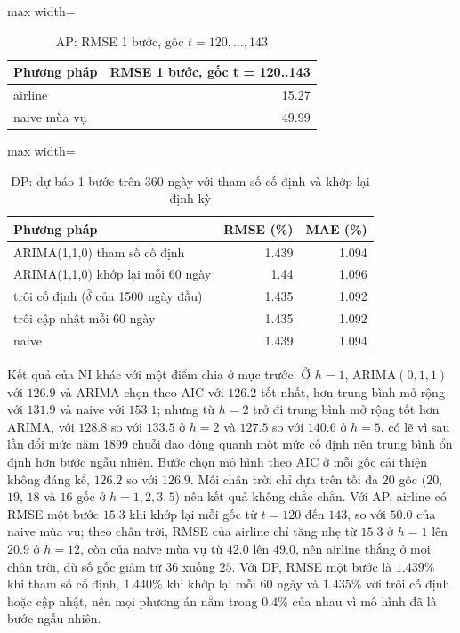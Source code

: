\begin{table}[H]
\centering\footnotesize
\caption{AP: RMSE 1 bước, gốc $t=120,\dots,143$}\label{tab:tab_b12_12_ap_one_step}
\begin{adjustbox}{max width=\linewidth}
\begin{tabular}{|l|r|}
\toprule
Phương pháp & RMSE 1 bước, gốc t = 120..143 \\
\midrule
airline & 15.27 \\
naive mùa vụ & 49.99 \\
\bottomrule
\end{tabular}
\end{adjustbox}
\end{table}
\begin{table}[H]
\centering\footnotesize
\caption{DP: dự báo 1 bước trên 360 ngày với tham số cố định và khớp lại định kỳ}\label{tab:tab_b12_12_dp_rolling}
\begin{adjustbox}{max width=\linewidth}
\begin{tabular}{|>{\raggedright\arraybackslash}p{}|r|r|}
\toprule
Phương pháp & RMSE (\%) & MAE (\%) \\
\midrule
ARIMA(1,1,0) tham số cố định & 1.439 & 1.094 \\[3pt]
ARIMA(1,1,0) khớp lại mỗi 60 ngày & 1.44 & 1.096 \\[3pt]
trôi cố định ($\hat{\delta}$ của 1500 ngày đầu) & 1.435 & 1.092 \\[3pt]
trôi cập nhật mỗi 60 ngày & 1.435 & 1.092 \\[3pt]
naive & 1.439 & 1.094 \\[3pt]
\bottomrule
\end{tabular}
\end{adjustbox}
\end{table}
 Kết quả của NI khác với một điểm chia ở mục trước. Ở $h=1$, ARIMA$(0,1,1)$ với $126.9$ và ARIMA chọn theo AIC với $126.2$ tốt nhất, hơn trung bình mở rộng với $131.9$ và naive với $153.1$; nhưng từ $h=2$ trở đi trung bình mở rộng tốt hơn ARIMA, với $128.8$ so với $133.5$ ở $h=2$ và $127.5$ so với $140.6$ ở $h=5$, có lẽ vì sau lần đổi mức năm 1899 chuỗi dao động quanh một mức cố định nên trung bình ổn định hơn bước ngẫu nhiên. Bước chọn mô hình theo AIC ở mỗi gốc cải thiện không đáng kể, $126.2$ so với $126.9$. Mỗi chân trời chỉ dựa trên tối đa $20$ gốc ($20$, $19$, $18$ và $16$ gốc ở $h=1,2,3,5$) nên kết quả không chắc chắn. Với AP, airline có RMSE một bước $15.3$ khi khớp lại mỗi gốc từ $t=120$ đến $143$, so với $50.0$ của naive mùa vụ; theo chân trời, RMSE của airline chỉ tăng nhẹ từ $15.3$ ở $h=1$ lên $20.9$ ở $h=12$, còn của naive mùa vụ từ $42.0$ lên $49.0$, nên airline thắng ở mọi chân trời, dù số gốc giảm từ $36$ xuống $25$. Với DP, RMSE một bước là $1.439\%$ khi tham số cố định, $1.440\%$ khi khớp lại mỗi $60$ ngày và $1.435\%$ với trôi cố định hoặc cập nhật, nên mọi phương án nằm trong $0.4\%$ của nhau vì mô hình đã là bước ngẫu nhiên.

